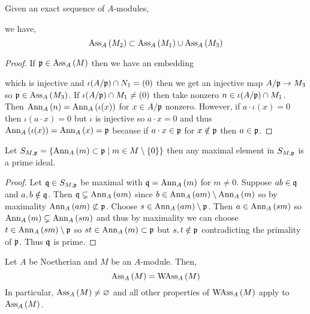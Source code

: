 \documentclass[12pt]{article}
\begin{document}
\begin{lemma}
Given an exact sequence of $A$-modules,
\begin{center}
\end{center}
we have, 
\[ \mathrm{Ass}_{A}\left( M_2 \right) \subset \mathrm{Ass}_{A}\left( M_1 \right) \cup \mathrm{Ass}_{A}\left( M_3 \right) \]
\end{lemma}

\begin{proof}
If $\mathfrak{p} \in \mathrm{Ass}_{A}\left( M \right)$ then we have an embedding
\begin{center}
\end{center}
which is injective and $\iota(A / \mathfrak{p}) \cap N_1 = (0)$
then we get an injective map $A / \mathfrak{p} \to M_3$ so $\mathfrak{p} \in \mathrm{Ass}_{A}\left( M_3 \right)$. If $\iota(A / \mathfrak{p}) \cap M_1 \neq (0)$ then take nonzero $n \in \iota(A / \mathfrak{p}) \cap M_1$. Then $\mathrm{Ann}_{A}\left(n\right) = \mathrm{Ann}_{A}\left(\iota(x)\right)$ for $x \in A / \mathfrak{p}$ nonzero. However, if $a \cdot \iota(x) = 0$ then $\iota(a \cdot x) = 0$ but $\iota$ is injective so $a \cdot x = 0$ and thus $\mathrm{Ann}_{A}\left(\iota(x)\right) = \mathrm{Ann}_{A}\left(x\right) = \mathfrak{p}$ because if $a \cdot x \in \mathfrak{p}$ for $x \notin \mathfrak{p}$ then $a \in \mathfrak{p}$. 
\end{proof}

\begin{lemma}
Let $S_{M, \mathfrak{p}} = \{ \mathrm{Ann}_{A}\left(m\right) \subset \mathfrak{p} \mid m \in M \setminus \{0\} \}$ then any maximal element in $S_{M, \mathfrak{p}}$ is a prime ideal.
\end{lemma}

\begin{proof}
Let $\mathfrak{q} \in S_{M, \mathfrak{p}}$ be maximal with $\mathfrak{q} = \mathrm{Ann}_{A}\left(m\right)$ for $m \neq 0$. Suppose $ab \in \mathfrak{q}$ and $a, b \notin \mathfrak{q}$. Then $\mathfrak{q} \subsetneq \mathrm{Ann}_{A}\left(a m\right)$ since $b \in \mathrm{Ann}_{A}\left(a m\right) \setminus \mathrm{Ann}_{A}\left(m\right)$ so by maximality $\mathrm{Ann}_{A}\left(am\right) \not\subset \mathfrak{p}$. Choose $s \in \mathrm{Ann}_{A}\left(am\right) \setminus \mathfrak{p}$. Then $a \in \mathrm{Ann}_{A}\left(sm\right)$ so $\mathrm{Ann}_{A}\left(m\right) \subsetneq \mathrm{Ann}_{A}\left(sm\right)$ and thus by maximality we can choose $t \in \mathrm{Ann}_{A}\left(sm\right) \setminus \mathfrak{p}$ so $st \in \mathrm{Ann}_{A}\left(m\right) \subset \mathfrak{p}$ but $s,t \notin \mathfrak{p}$ contradicting the primality of $\mathfrak{p}$. Thus $\mathfrak{q}$ is prime. 
\end{proof}

\begin{prop}
Let $A$ be Noetherian and $M$ be an $A$-module. Then,
\[ \mathrm{Ass}_{A}\left( M \right) = \mathrm{WAss}_{A}\left(M \right)  \]
In particular, $\mathrm{Ass}_{A}\left( M \right) \neq \varnothing$ and all other properties of $\mathrm{WAss}_{A}\left(M \right)$ apply to $\mathrm{Ass}_{A}\left( M \right)$.
\end{prop}
\end{document}
